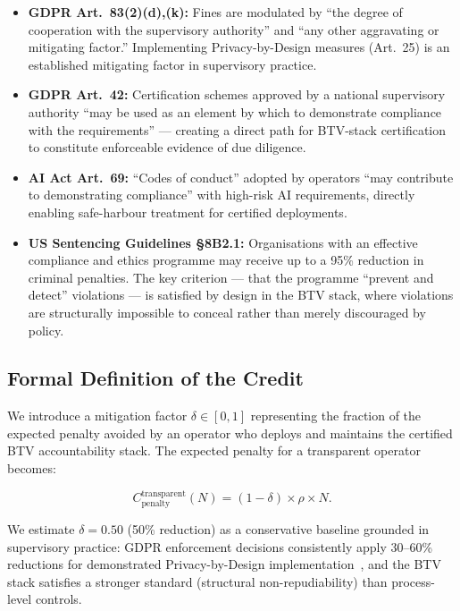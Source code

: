\begin{itemize}
  \item \textbf{GDPR Art.~83(2)(d),(k):} Fines are modulated by
  ``the degree of cooperation with the supervisory authority'' and
  ``any other aggravating or mitigating factor.'' Implementing
  Privacy-by-Design measures (Art.~25) is an established mitigating
  factor in supervisory practice.

  \item \textbf{GDPR Art.~42:} Certification schemes approved by a
  national supervisory authority ``may be used as an element by
  which to demonstrate compliance with the requirements'' --- creating
  a direct path for BTV-stack certification to constitute
  enforceable evidence of due diligence.

  \item \textbf{AI Act Art.~69:} ``Codes of conduct'' adopted by
  operators ``may contribute to demonstrating compliance'' with
  high-risk AI requirements, directly enabling safe-harbour
  treatment for certified deployments.

  \item \textbf{US Sentencing Guidelines \S8B2.1:} Organisations
  with an effective compliance and ethics programme may receive
  up to a 95\% reduction in criminal penalties. The key criterion ---
  that the programme ``prevent and detect'' violations --- is
  satisfied by design in the BTV stack, where violations are
  structurally impossible to conceal rather than merely discouraged
  by policy.
\end{itemize}

\subsection{Formal Definition of the Credit}
\label{subsec:formal-credit}

We introduce a mitigation factor $\delta \in [0, 1]$ representing the
fraction of the expected penalty avoided by an operator who deploys
and maintains the certified BTV accountability stack. The expected
penalty for a transparent operator becomes:

\[
  C_{\text{penalty}}^{\text{transparent}}(N)
  = (1 - \delta) \times \rho \times N.
\]

We estimate $\delta = 0.50$ (50\% reduction) as a conservative
baseline grounded in supervisory practice: GDPR enforcement decisions
consistently apply 30--60\% reductions for demonstrated
Privacy-by-Design implementation~\cite{gdpr-fines-2025}, and the
BTV stack satisfies a stronger standard (structural non-repudiability)
than process-level controls.

